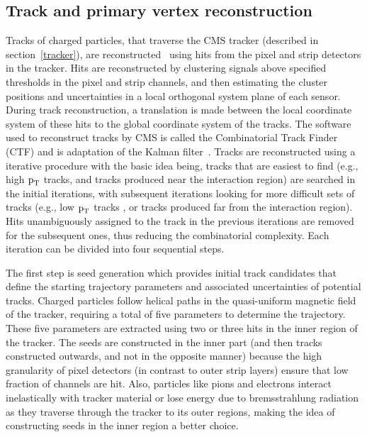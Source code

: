 \subsection{Track and primary vertex reconstruction}
\label{track_recon}

Tracks of charged particles, that traverse the CMS tracker (described in section~\ref{tracker}), are reconstructed~\cite{track_reconstruction} using hits from the pixel and strip detectors in the tracker. Hits are reconstructed by clustering signals above specified thresholds in the pixel and strip channels, and then estimating the cluster positions and uncertainties in a local orthogonal system plane of each sensor. During track reconstruction, a translation is made between the local coordinate system of these hits to the global coordinate system of the tracks. The software used to reconstruct tracks by CMS is called the Combinatorial Track Finder (CTF) and is adaptation of the Kalman filter~\cite{kalman_filter}. Tracks are reconstructed using a iterative procedure with the basic idea being, tracks that are easiest to find (e.g., high $\text{p}_\text{T}$ tracks, and tracks produced near the interaction region) are searched in the initial iterations, with subsequent iterations looking for more difficult sets of tracks (e.g., low $\text{p}_\text{T}$ tracks , or tracks produced far from the interaction region). Hits unambiguously assigned to the track in the previous iterations are removed for the subsequent ones, thus reducing the combinatorial complexity. Each iteration can be divided into four sequential steps.

The first step is seed generation which provides initial track candidates that define the starting trajectory parameters and associated uncertainties of potential tracks. Charged particles follow helical paths in the quasi-uniform magnetic field of the tracker, requiring a total of five parameters to determine the trajectory. These five parameters are extracted using two or three hits in the inner region of the tracker. The seeds are constructed in the inner part (and then tracks constructed outwards, and not in the opposite manner) because the high granularity of pixel detectors (in contrast to outer strip layers)  ensure that low fraction of channels are hit. Also, particles like pions and electrons interact inelastically with tracker material or lose energy due to bremsstrahlung radiation as they traverse through the tracker to its outer regions, making the idea of constructing seeds in the inner region a better choice.

